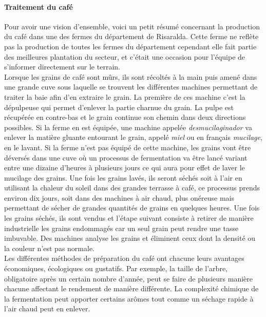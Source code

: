 \paragraph{Traitement du café} Pour avoir une vision d'ensemble, voici un petit résumé concernant la production du café dans une des fermes du département de Risaralda. Cette ferme ne reflète pas la production de toutes les fermes du département cependant elle fait partie des meilleures plantation du secteur, et c'était une occasion pour l'équipe de s'informer directement sur le terrain. \\

\noindent Lorsque les grains de café sont mûrs, ils sont récoltés à la main puis amené dans une grande cuve sous laquelle se trouvent les différentes machines permettant de traiter la baie afin d'en extraire le grain. La première de ces machine c'est la dépulpeuse qui permet d'enlever la partie charnue du grain. La pulpe est récupérée en contre-bas et le grain continue son chemin dans deux directions possibles. Si la ferme en est équipée, une machine appelée \textit{desmucilaginador} va enlever la matière gluante entourant le grain, appelé \textit{miel} ou en français \textit{mucilage}, en le lavant. Si la ferme n'est pas équipé de cette machine, les grains vont être déversés dans une cuve où un processus de fermentation va être lancé variant entre une dizaine d'heures à plusieurs jours ce qui aura pour effet de laver le mucilage des grains. Une fois les grains lavés, ils seront séchés soit à l'air en utilisant la chaleur du soleil dans des grandes terrasse à café, ce processus prends environ dix jours, soit dans des machines à air chaud, plus onéreuse mais permettant de sécher de grandes quantités de grains en quelques heures. Une fois les grains séchés, ils sont vendus et l'étape suivant consiste à retirer de manière industrielle les grains endommagés car un seul grain peut rendre une tasse imbuvable. Des machines analyse les grains et éliminent ceux dont la densité ou la couleur n'est pas normale.\cite{GuideCafe} \\

\noindent Les différentes méthodes de préparation du café ont chacune leurs avantages économiques, écologiques ou gustatifs. Par exemple, la taille de l'arbre, obligatoire après un certain nombre d'année, peut se faire de plusieurs manière chacune affectant le rendement de manière différente. La complexité chimique de la fermentation peut apporter certains arômes tout comme un séchage rapide à l'air chaud peut en enlever. %



